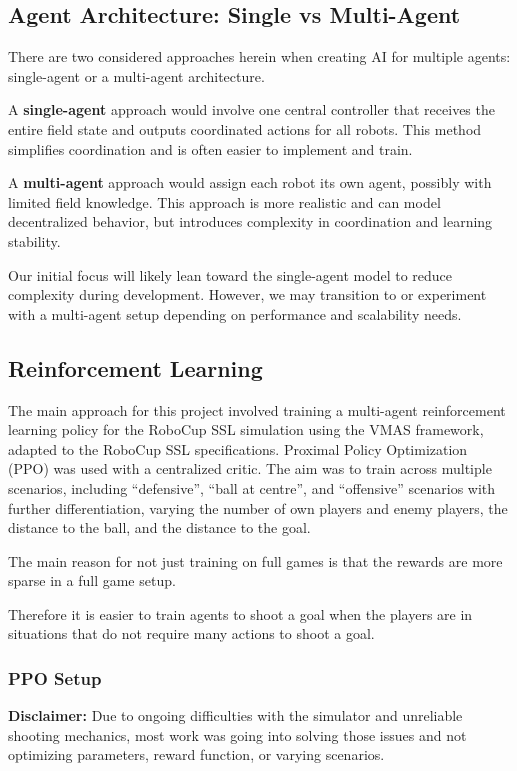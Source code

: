 \subsection{Agent Architecture: Single vs Multi-Agent}

There are two considered approaches herein when creating AI for multiple agents: single-agent or a multi-agent architecture.

A \textbf{single-agent} approach would involve one central controller that receives the entire field state and outputs coordinated actions for all robots. This method simplifies coordination and is often easier to implement and train.

A \textbf{multi-agent} approach would assign each robot its own agent, possibly with limited field knowledge. This approach is more realistic and can model decentralized behavior, but introduces complexity in coordination and learning stability.

Our initial focus will likely lean toward the single-agent model to reduce complexity during development. However, we may transition to or experiment with a multi-agent setup depending on performance and scalability needs.

\subsection{Reinforcement Learning}
The main approach for this project involved training a multi-agent reinforcement learning policy for the RoboCup SSL simulation using the VMAS framework, adapted to the RoboCup SSL specifications.  
Proximal Policy Optimization (PPO) was used with a centralized critic.  
The aim was to train across multiple scenarios, including ``defensive'', ``ball at centre'', and ``offensive'' scenarios with further differentiation, varying the number of own players and enemy players, the distance to the ball, and the distance to the goal.

The main reason for not just training on full games is that the rewards are more sparse in a full game setup.

Therefore it is easier to train agents to shoot a goal when the players are in situations that do not require many actions to shoot a goal.

\subsubsection{PPO Setup}
\textbf{Disclaimer:} Due to ongoing difficulties with the simulator and unreliable shooting mechanics, most work was going into solving those issues and not optimizing parameters, reward function, or varying scenarios.

